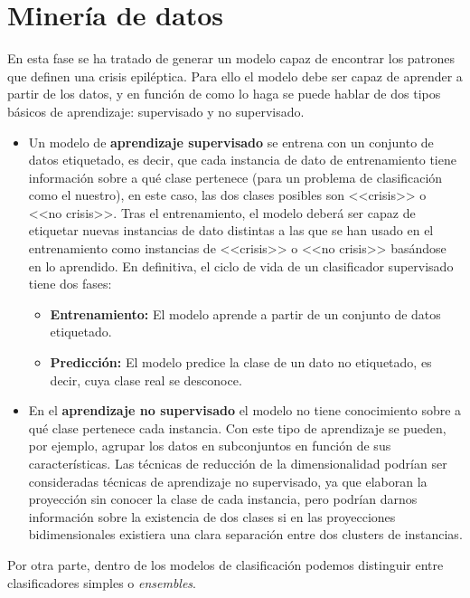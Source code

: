 \section{Minería de datos}

En esta fase se ha tratado de generar un modelo capaz de encontrar los patrones que definen una crisis epiléptica. Para ello el modelo debe ser capaz de aprender a partir de los datos, y en función de como lo haga se puede hablar de dos tipos básicos de aprendizaje: supervisado y no supervisado. 

\begin{itemize}
	\item Un modelo de \textbf{aprendizaje supervisado} se entrena con un conjunto de datos etiquetado, es decir, que cada instancia de dato de entrenamiento tiene información sobre a qué clase pertenece (para un problema de clasificación como el nuestro), en este caso, las dos clases posibles son <<crisis>> o <<no crisis>>. Tras el entrenamiento, el modelo deberá ser capaz de etiquetar nuevas instancias de dato distintas a las que se han usado en el entrenamiento como instancias de <<crisis>> o <<no crisis>> basándose en lo aprendido. En definitiva, el ciclo de vida de un clasificador supervisado tiene dos fases: 
	\begin{itemize}
		\item \textbf{Entrenamiento:} El modelo aprende a partir de un conjunto de datos etiquetado. 
		\item \textbf{Predicción:} El modelo predice la clase de un dato no etiquetado, es decir, cuya clase real se desconoce. 
	\end{itemize}
	
	\item En el \textbf{aprendizaje no supervisado} el modelo no tiene conocimiento sobre a qué clase pertenece cada instancia. Con este tipo de aprendizaje se pueden, por ejemplo, agrupar los datos en subconjuntos en función de sus características. Las técnicas de reducción de la dimensionalidad podrían ser consideradas técnicas de aprendizaje no supervisado, ya que elaboran la proyección sin conocer la clase de cada instancia, pero podrían darnos información sobre la existencia de dos clases si en las proyecciones bidimensionales existiera una clara separación entre dos clusters de instancias. 
\end{itemize}

Por otra parte, dentro de los modelos de clasificación podemos distinguir entre clasificadores simples o \textit{ensembles}.

